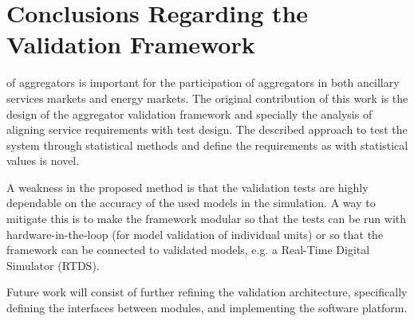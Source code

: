 \section{Conclusions Regarding the Validation Framework}
 of aggregators is important for the participation of aggregators in both ancillary services markets and energy markets. The original contribution of this work is the design of the aggregator validation framework and specially the analysis of aligning service requirements with test design. The described approach to test the system through statistical methods and define the requirements as with statistical values is novel.

A weakness in the proposed method is that the validation tests are highly dependable on the accuracy of the used models in the simulation. A way to mitigate this is to make the framework modular so that the tests can be run with hardware-in-the-loop (for model validation of individual units) or so that the framework can be connected to validated models, e.g. a Real-Time Digital Simulator (RTDS). 

Future work will consist of further refining the validation architecture, specifically defining the interfaces between modules, and implementing the software platform.
